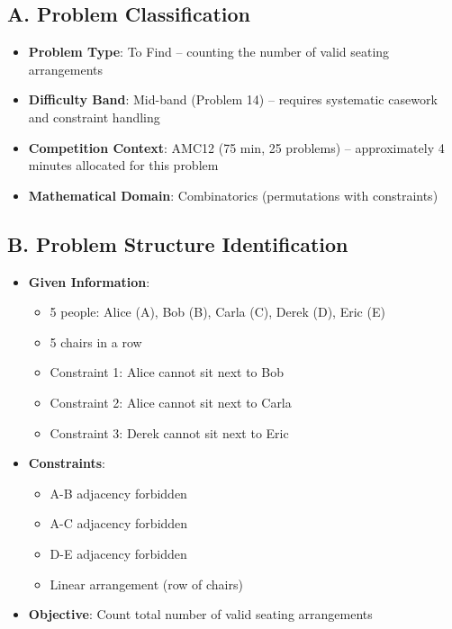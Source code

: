 \documentclass[]{article}
\begin{document}
\begin{problemconfigbox}
\subsection*{A. Problem Classification}
\begin{itemize}[leftmargin=*]
    \item \textbf{Problem Type}: To Find -- counting the number of valid seating arrangements
    \item \textbf{Difficulty Band}: Mid-band (Problem 14) -- requires systematic casework and constraint handling
    \item \textbf{Competition Context}: AMC12 (75 min, 25 problems) -- approximately 4 minutes allocated for this problem
    \item \textbf{Mathematical Domain}: Combinatorics (permutations with constraints)
\end{itemize}

\subsection*{B. Problem Structure Identification}
\begin{itemize}[leftmargin=*]
    \item \textbf{Given Information}: 
    \begin{itemize}
        \item 5 people: Alice (A), Bob (B), Carla (C), Derek (D), Eric (E)
        \item 5 chairs in a row
        \item Constraint 1: Alice cannot sit next to Bob
        \item Constraint 2: Alice cannot sit next to Carla
        \item Constraint 3: Derek cannot sit next to Eric
    \end{itemize}
    
    \item \textbf{Constraints}: 
    \begin{itemize}
        \item A-B adjacency forbidden
        \item A-C adjacency forbidden
        \item D-E adjacency forbidden
        \item Linear arrangement (row of chairs)
    \end{itemize}
    
    \item \textbf{Objective}: Count total number of valid seating arrangements
    

\end{itemize}
\end{problemconfigbox}
\end{document}
